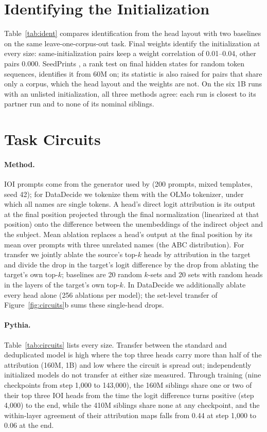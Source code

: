 \documentclass[11pt]{article}
\begin{document}
\section{Identifying the Initialization}
\label{app:ident}

Table~\ref{tab:ident} compares identification from the head layout with two baselines on the same leave-one-corpus-out task.
Final weights identify the initialization at every size: same-initialization pairs keep a weight correlation of 0.01--0.04, other pairs 0.000.
SeedPrints \citep{tong2026seedprints}, a rank test on final hidden states for random token sequences, identifies it from 60M on; its statistic is also raised for pairs that share only a corpus, which the head layout and the weights are not.
On the six 1B runs with an unlisted initialization, all three methods agree: each run is closest to its partner run and to none of its nominal siblings.

\section{Task Circuits}
\label{app:circuits}

\paragraph{Method.} IOI prompts come from the generator used by \citet{tigges2024llm} (200 prompts, mixed templates, seed 42); for DataDecide we tokenize them with the OLMo tokenizer, under which all names are single tokens. A head's direct logit attribution is its output at the final position projected through the final normalization (linearized at that position) onto the difference between the unembeddings of the indirect object and the subject. Mean ablation replaces a head's output at the final position by its mean over prompts with three unrelated names (the ABC distribution). For transfer we jointly ablate the source's top-$k$ heads by attribution in the target and divide the drop in the target's logit difference by the drop from ablating the target's own top-$k$; baselines are 20 random $k$-sets and 20 sets with random heads in the layers of the target's own top-$k$. In DataDecide we additionally ablate every head alone (256 ablations per model); the set-level transfer of Figure~\ref{fig:circuits}b sums these single-head drops.
\paragraph{Pythia.} Table~\ref{tab:circuits} lists every size. Transfer between the standard and deduplicated model is high where the top three heads carry more than half of the attribution (160M, 1B) and low where the circuit is spread out; independently initialized models do not transfer at either size measured. Through training (nine checkpoints from step 1{,}000 to 143{,}000), the 160M siblings share one or two of their top three IOI heads from the time the logit difference turns positive (step 4{,}000) to the end, while the 410M siblings share none at any checkpoint, and the within-layer agreement of their attribution maps falls from 0.44 at step 1{,}000 to 0.06 at the end.
\end{document}
